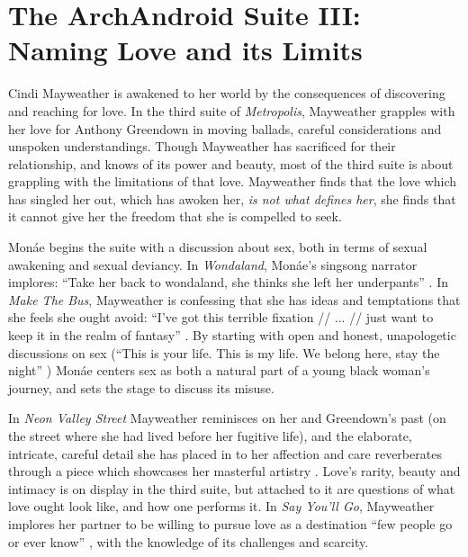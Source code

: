 \documentclass[a4paper, 11pt]{article} %
\begin{document}

\section*{The ArchAndroid Suite III: Naming Love and its Limits}

Cindi Mayweather is awakened to her world by the consequences of discovering and reaching for love.
In the third suite of \emph{Metropolis}, Mayweather grapples with her love for Anthony Greendown in moving ballads, careful considerations and unspoken understandings.
Though Mayweather has sacrificed for their relationship, and knows of its power and beauty, most of the third suite is about grappling with the limitations of that love.
Mayweather finds that the love which has singled her out, which has awoken her, \emph{is not what defines her}, she finds that it cannot give her the freedom that she is compelled to seek.

Mon\'ae begins the suite with a discussion about sex, both in terms of sexual awakening and sexual deviancy.
In \emph{Wondaland}, Mon\'ae's singsong narrator implores: ``Take her back to wondaland, she thinks she left her underpants'' \cite{wondaland}.
In \emph{Make The Bus}, Mayweather is confessing that she has ideas and temptations that she feels she ought avoid:
``I've got this terrible fixation // ... // just want to keep it in the realm of fantasy'' \cite{makethebus}.
By starting with open and honest, unapologetic discussions on sex (``This is your life. This is my life. We belong here, stay the night'' \cite{wondaland}) 
Mon\'ae centers sex as both a natural part of a young black woman's journey, and sets the stage to discuss its misuse.

In \emph{Neon Valley Street} Mayweather reminisces on her and Greendown's past (on the street where she had lived before her fugitive life), and the elaborate, intricate, careful detail she has placed in to her affection and care reverberates through a piece which showcases her masterful artistry \cite{neonvalleystreet}.
Love's rarity, beauty and intimacy is on display in the third suite, but attached to it are questions of what love ought look like, and how one performs it.
In \emph{Say You'll Go}, Mayweather implores her partner to be willing to pursue love as a destination ``few people go or ever know'' \cite{sayyouwillgo}, with the knowledge of its challenges and scarcity.
\end{document}
